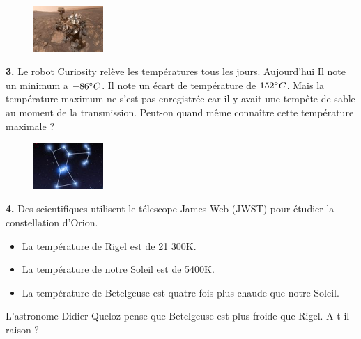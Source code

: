 \newpage

\begin{minipage}[t]{0.25\textwidth}
  \begin{figure}[H]
    \centering
    \includegraphics[width=100px]{4x2-nombres-relatifs/ex5.jpg}
  \end{figure}
\end{minipage}
\begin{minipage}[t]{0.75\textwidth}
  \textbf{3.} Le robot Curiosity relève les températures tous les jours. Aujourd'hui Il note un minimum a $-86 \degree C$. Il note un écart de température de $ 152\degree C$. Mais la température maximum ne s'est pas enregistrée car il y avait une tempête de sable au moment de la transmission. Peut-on quand même connaître cette température maximale ?\\
  \Pointilles[3]
\end{minipage}

\Pointilles[2]

\begin{minipage}[t]{0.25\textwidth}
  \begin{figure}[H]
    \centering
    \includegraphics[width=100px]{4x2-nombres-relatifs/ex7.jpg}
  \end{figure}
\end{minipage}
  \begin{minipage}[t]{0.75\textwidth}
    \textbf{4.} Des scientifiques utilisent le télescope James Web (JWST) pour étudier la constellation d'Orion.
  \begin{itemize}
    \item La température de Rigel est de 21 300K.
    \item La température de notre Soleil est de 5400K.
    \item La température de Betelgeuse est quatre fois plus chaude que notre Soleil.
  \end{itemize}
  L'astronome Didier Queloz pense que Betelgeuse est plus froide que Rigel. A-t-il raison ? \\
\end{minipage}

